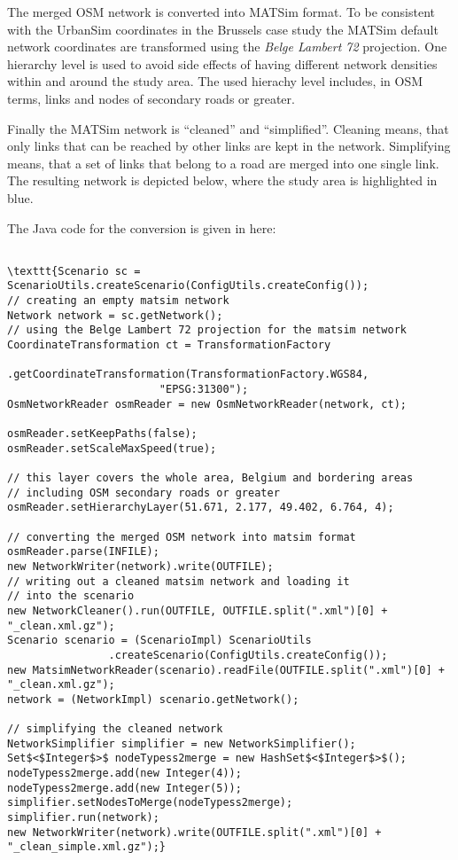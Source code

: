 \documentclass[a4paper,11pt]{report}
\begin{document}
The merged OSM network is converted into MATSim format. To be  consistent with the UrbanSim coordinates in the Brussels case study the  MATSim default network coordinates are transformed using the \emph{Belge Lambert 72}  projection. One hierarchy level is used to avoid side effects of having  different network densities within and around the study area. The used  hierachy level includes, in OSM terms, links and nodes of secondary  roads or greater.

Finally the MATSim network is “cleaned” and “simplified”. Cleaning  means, that only links that can be reached by other links are kept in  the network. Simplifying means, that a set of links that belong to a  road are merged into one single link. The resulting network is depicted  below, where the study area is highlighted in blue.

The Java code for the conversion is given in here:
\begin{verbatim}

\texttt{Scenario sc = ScenarioUtils.createScenario(ConfigUtils.createConfig());
// creating an empty matsim network
Network network = sc.getNetwork();
// using the Belge Lambert 72 projection for the matsim network
CoordinateTransformation ct = TransformationFactory
                .getCoordinateTransformation(TransformationFactory.WGS84,
                        "EPSG:31300");
OsmNetworkReader osmReader = new OsmNetworkReader(network, ct);

osmReader.setKeepPaths(false);
osmReader.setScaleMaxSpeed(true);

// this layer covers the whole area, Belgium and bordering areas
// including OSM secondary roads or greater
osmReader.setHierarchyLayer(51.671, 2.177, 49.402, 6.764, 4);

// converting the merged OSM network into matsim format
osmReader.parse(INFILE);
new NetworkWriter(network).write(OUTFILE);
// writing out a cleaned matsim network and loading it
// into the scenario
new NetworkCleaner().run(OUTFILE, OUTFILE.split(".xml")[0] + "_clean.xml.gz");
Scenario scenario = (ScenarioImpl) ScenarioUtils
                .createScenario(ConfigUtils.createConfig());
new MatsimNetworkReader(scenario).readFile(OUTFILE.split(".xml")[0] + "_clean.xml.gz");
network = (NetworkImpl) scenario.getNetwork();

// simplifying the cleaned network
NetworkSimplifier simplifier = new NetworkSimplifier();
Set$<$Integer$>$ nodeTypess2merge = new HashSet$<$Integer$>$();
nodeTypess2merge.add(new Integer(4));
nodeTypess2merge.add(new Integer(5));
simplifier.setNodesToMerge(nodeTypess2merge);
simplifier.run(network);
new NetworkWriter(network).write(OUTFILE.split(".xml")[0] + "_clean_simple.xml.gz");}
\end{verbatim}
\end{document}

